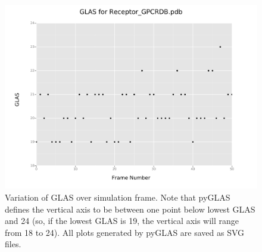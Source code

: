 \documentclass[12pt]{article}
\begin{document}
\begin{figure}[h!]
	\centering
	\includegraphics[scale=0.5]{Receptor_GPCRDB_GLAS_overTime.png}
	\caption{Variation of GLAS over simulation frame. Note that pyGLAS defines the vertical axis to be between one point below lowest GLAS and 24 (so, if the lowest GLAS is 19, the vertical axis will range from 18 to 24). All plots generated by pyGLAS are saved as SVG files.}
\end{figure}
\end{document}
